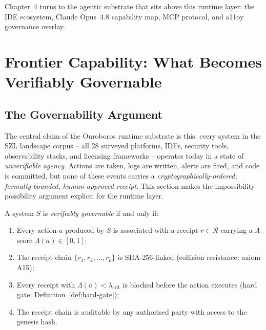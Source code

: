 Chapter~4 turns to the agentic substrate that sits above this runtime
layer: the IDE ecosystem, Claude Opus~4.8 capability map, MCP protocol,
and a11oy governance overlay.

\section{Frontier Capability: What Becomes Verifiably Governable}
\label{sec:runtime-frontier}

\subsection{The Governability Argument}
\label{ssec:governability-argument}

The central claim of the Ouroboros runtime substrate is this: every system
in the SZL landscape corpus -- all 28 surveyed platforms, IDEs, security
tools, observability stacks, and licensing frameworks -- operates today in
a state of \emph{unverifiable agency}.  Actions are taken, logs are written,
alerts are fired, and code is committed, but none of these events carries
a \emph{cryptographically-ordered, formally-bounded, human-approved receipt}.
This section makes the impossibility--possibility argument explicit for the
runtime layer.

\begin{definition}
  \label{def:verifiable-governability}
  A system \(S\) is \emph{verifiably governable} if and only if:
  \begin{enumerate}
    \item Every action $a$ produced by $S$ is associated with a receipt
      $r \in \mathcal{R}$ carrying a $\Lambda$-score $\Lambda(a) \in [0,1]$;
    \item The receipt chain $\{r_1, r_2, \ldots, r_k\}$ is SHA-256-linked
      (collision resistance: axiom A15);
    \item Every receipt with $\Lambda(a) < \lambda_{\mathrm{crit}}$ is
      blocked before the action executes (hard gate: Definition~\ref{def:hard-gate});
    \item The receipt chain is auditable by any authorised party with
      access to the genesis hash.
  \end{enumerate}
\end{definition}

